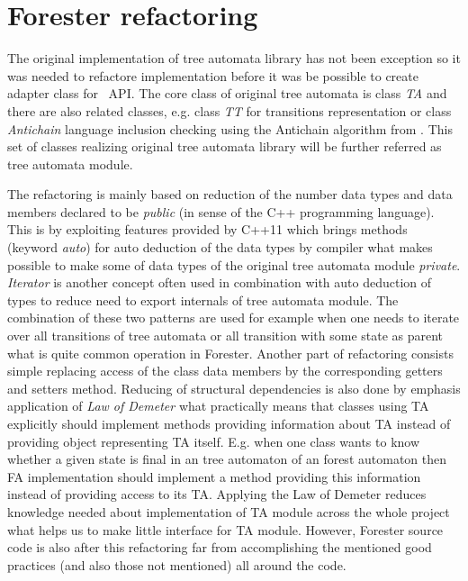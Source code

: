 \section{Forester refactoring}
\label{sec:forester_prep}

The original implementation of tree automata library has not been exception so it was needed
to refactore implementation before it was be possible to create adapter class for \vata\ API.
The core class of original tree automata is class \emph{TA} and there are also related classes,
e.g. class \emph{TT} for transitions representation or class \emph{Antichain} language inclusion checking using the Antichain algorithm from \cite{tacas10}.
This set of classes realizing original tree automata library will be further referred as tree automata module.

The refactoring is mainly based on reduction of the number data types and data members declared
to be \emph{public} (in sense of the C++ programming language).
This is by exploiting features provided by C++11 \cite{stroustrup13} which brings methods (keyword \emph{auto})
for auto deduction of the data types by compiler what makes possible to make some of data types of the original tree automata module \emph{private}.
\emph{Iterator} is another concept often used in combination with auto deduction of types to reduce need to export internals of tree automata module.
The combination of these two patterns are used for example when one needs to iterate over all transitions of tree automata or all transition with some
state as parent what is quite common operation in Forester.
Another part of refactoring consists simple replacing access of the class data members by the corresponding getters and setters method.
Reducing of structural dependencies is also done by emphasis application of \emph{Law of Demeter} \cite{lod89} what practically
means that classes using TA explicitly should implement methods providing information about TA instead of providing object representing TA itself.
E.g. when one class wants to know whether a given state is final in an tree automaton of an forest automaton then FA implementation should
implement a method providing this information instead of providing access to its TA.
Applying the Law of Demeter reduces knowledge needed about implementation of TA module across the whole project what
helps us to make little interface for TA module.
However, Forester source code is also after this refactoring far from accomplishing the mentioned good practices (and also those not mentioned) all around the code.

